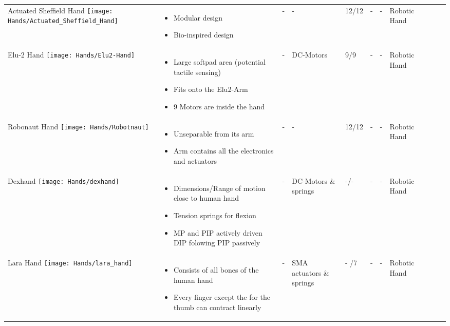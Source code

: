 \documentclass[main]{subfiles}
\begin{document}
\begin{longtable}{@{}p{6cm}p{4cm}p{0.7cm}p{1.2cm}p{1cm}p{1cm}p{1cm}p{1cm}p{1cm}p{1cm}p{2cm}@{}}
Actuated Sheffield Hand \newline
\texttt{[image: Hands/Actuated\_Sheffield\_Hand]}& 
\begin{itemize}\itemsep0em
\item Modular design
\item Bio-inspired design
\end{itemize} 
& - & - & 12/12 & - & -  & Robotic Hand\\

Elu-2 Hand \newline
\texttt{[image: Hands/Elu2-Hand]}& 
\begin{itemize}\itemsep0em
\item Large softpad area (potential tactile sensing)
\item Fits onto the Elu2-Arm
\item 9 Motors are inside the hand
\end{itemize} 
& - & DC-Motors & 9/9 & - & -  & Robotic Hand\\

Robonaut Hand \newline
\texttt{[image: Hands/Robotnaut]}& 
\begin{itemize}\itemsep0em
\item Unseparable from its arm
\item Arm contains all the electronics and actuators
\end{itemize} 
& - & - & 12/12 & - & -  & Robotic Hand\\

Dexhand \newline
\texttt{[image: Hands/dexhand]}& 
\begin{itemize}\itemsep0em
\item Dimensions/Range of motion close to human hand
\item Tension springs for flexion
\item MP and PIP actively driven DIP folowing PIP passively
\end{itemize} 
& - & DC-Motors \& springs & -/- & - & -  & Robotic Hand\\

Lara Hand \newline
\texttt{[image: Hands/lara\_hand]}& 
\begin{itemize}\itemsep0em
\item Consists of all bones of the human hand
\item Every finger except the for the thumb can contract linearly
\end{itemize} 
& - & SMA actuators \& springs & - /7 & - & -  & Robotic Hand\\


\end{longtable}
\end{document}
